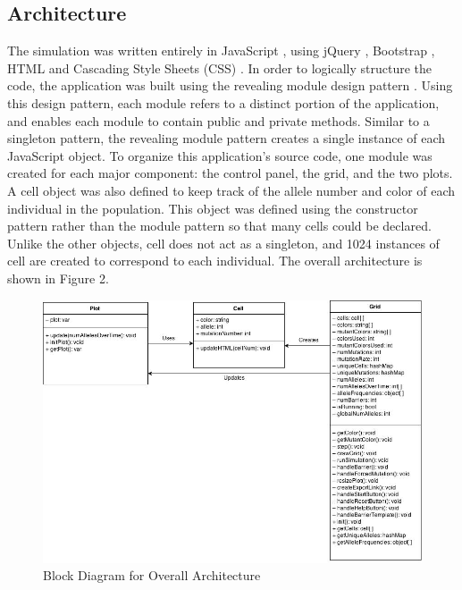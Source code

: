 \documentclass[12pt]{article}
\begin{document}
\begin{spacing}{1.6}
\subsection{Architecture}
The simulation was written entirely in JavaScript \cite{jsTutorial}, using jQuery \cite{jQuery}, Bootstrap \cite{bootstrap}, HTML \cite{htmlTutorial} and Cascading Style Sheets (CSS) \cite{cssTutorial}. In order to logically structure the code, the application was built using the revealing module design pattern \cite{js}. Using this design pattern, each module refers to a distinct portion of the application, and enables each module to contain public and private methods. Similar to a singleton pattern, the revealing module pattern creates a single instance of each JavaScript object. To organize this application's source code, one module was created for each major component: the control panel, the grid, and the two plots. A cell object was also defined to keep track of the allele number and color of each individual in the population. This object was defined using the constructor pattern \cite{js} rather than the module pattern so that many cells could be declared. Unlike the other objects, cell does not act as a singleton, and 1024 instances of cell are created to correspond to each individual. The overall architecture is shown in Figure 2.
\begin{figure}[h]
\caption{Block Diagram for Overall Architecture}
\centering
\includegraphics[scale=0.5]{block-diagram}
\end{figure}


\end{spacing}
\end{document}
